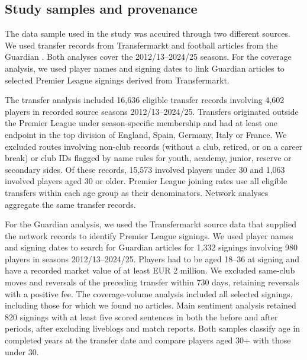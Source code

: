 \subsection*{Study samples and provenance}
The data sample used in the study was accuired through two different sources. We used transfer records from Transfermarkt and football articles from the Guardian \cite{transfermarkt_kaggle, guardian_api}. Both analyses cover the 2012/13--2024/25 seasons. For the coverage analysis, we used player names and signing dates to link Guardian articles to selected Premier League signings derived from Transfermarkt. 

 The transfer analysis included 16,636 eligible transfer records involving 4,602 players in recorded source seasons 2012/13--2024/25. Transfers originated outside the Premier League under season-specific membership and had at least one endpoint in the top division of England, Spain, Germany, Italy or France. We excluded routes involving non-club records (without a club, retired, or on a career break) or club IDs flagged by name rules for youth, academy, junior, reserve or secondary sides. Of these records, 15,573 involved players under 30 and 1,063 involved players aged 30 or older. Premier League joining rates use all eligible transfers within each age group as their denominators. Network analyses aggregate the same transfer records.

For the Guardian analysis, we used the Transfermarkt source data that supplied the network records to identify Premier League signings. We used player names and signing dates to search for Guardian articles for 1,332 signings involving 980 players in seasons 2012/13--2024/25. Players had to be aged 18--36 at signing and have a recorded market value of at least EUR 2 million. We excluded same-club moves and reversals of the preceding transfer within 730 days, retaining reversals with a positive fee. The coverage-volume analysis included all selected signings, including those for which we found no articles. Main sentiment analysis retained 820 signings with at least five scored sentences in both the before and after periods, after excluding liveblogs and match reports. Both samples classify age in completed years at the transfer date and compare players aged 30+ with those under 30.

